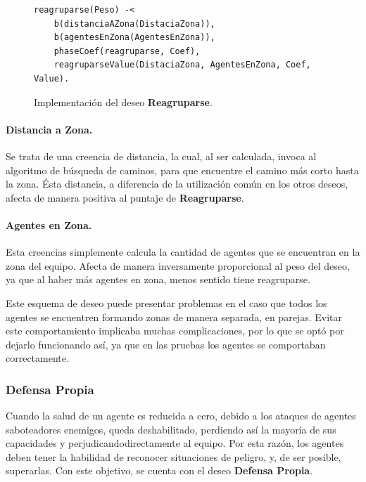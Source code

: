 \documentclass[oneside]{book}
\theoremstyle{definition}
\theoremstyle{example}
\begin{document}
\begin{figure}
\begin{verbatim}
reagruparse(Peso) -< 
    b(distanciaAZona(DistaciaZona)),
	b(agentesEnZona(AgentesEnZona)),
    phaseCoef(reagruparse, Coef),
    reagruparseValue(DistaciaZona, AgentesEnZona, Coef, Value).
\end{verbatim}
\caption{Implementación del deseo \textbf{Reagruparse}.}
\label{fig:deseoReagruparse}
\end{figure}


\paragraph{Distancia a Zona.}

Se trata de una creencia de distancia, la cual, al ser calculada, invoca al algoritmo
de búsqueda de caminos, para que encuentre el camino más corto hasta la zona. Ésta 
distancia, a diferencia de la utilización común en los otros deseos, afecta de manera 
positiva al puntaje de \textbf{Reagruparse}.

\paragraph{Agentes en Zona.}

Esta creencias simplemente calcula la cantidad de agentes que se encuentran en la zona
del equipo. Afecta de manera inversamente proporcional al peso del deseo, ya que al 
haber más agentes en zona, menos sentido tiene reagruparse.

\vspace{\baselineskip} 
Este esquema de deseo puede presentar problemas en el caso que todos los agentes se 
encuentren formando zonas de manera separada, en parejas. Evitar este comportamiento
implicaba muchas complicaciones, por lo que se optó por dejarlo funcionando así, ya
que en las pruebas los agentes se comportaban correctamente.


\subsubsection{Defensa Propia}

Cuando la salud de un agente es reducida a cero, debido a los ataques de 
agentes saboteadores enemigos, queda deshabilitado, perdiendo así la mayoría 
de sus capacidades y perjudicandodirectamente al equipo. Por esta razón, los 
agentes deben tener la habilidad de reconocer situaciones de peligro, y, de 
ser posible, superarlas. Con este objetivo, se cuenta con el deseo 
\textbf{Defensa Propia}.
\end{document}
